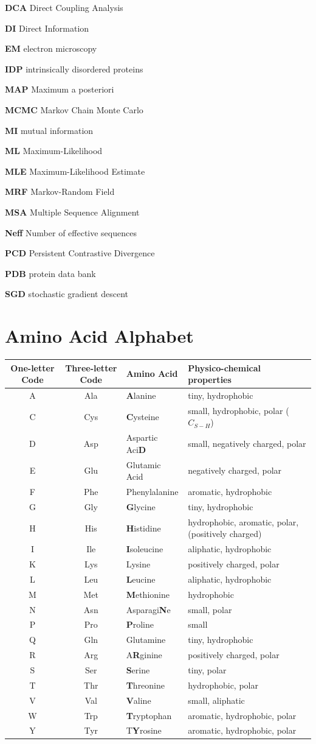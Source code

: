 \documentclass[12pt,a4paper,twoside]{book}
\theoremstyle{definition}
\theoremstyle{definition}
\theoremstyle{remark}
\begin{document}
\textbf{DCA} Direct Coupling Analysis

\textbf{DI} Direct Information

\textbf{EM} electron microscopy

\textbf{IDP} intrinsically disordered proteins

\textbf{MAP} Maximum a posteriori

\textbf{MCMC} Markov Chain Monte Carlo

\textbf{MI} mutual information

\textbf{ML} Maximum-Likelihood

\textbf{MLE} Maximum-Likelihood Estimate

\textbf{MRF} Markov-Random Field

\textbf{MSA} Multiple Sequence Alignment

\textbf{Neff} Number of effective sequences

\textbf{PCD} Persistent Contrastive Divergence

\textbf{PDB} protein data bank

\textbf{SGD} stochastic gradient descent

\pagebreak

\section{Amino Acid Alphabet}\label{amino-acids}

\begin{longtable}[]{@{}ccll@{}}
\toprule
One-letter Code & Three-letter Code & Amino Acid & Physico-chemical
properties\tabularnewline
\midrule
\endhead
A & Ala & \textbf{A}lanine & tiny, hydrophobic\tabularnewline
C & Cys & \textbf{C}ysteine & small, hydrophobic, polar
(\(C_{S-H}\))\tabularnewline
D & Asp & Aspartic Aci\textbf{D} & small, negatively charged,
polar\tabularnewline
E & Glu & Glutamic Acid & negatively charged, polar\tabularnewline
F & Phe & Phenylalanine & aromatic, hydrophobic\tabularnewline
G & Gly & \textbf{G}lycine & tiny, hydrophobic\tabularnewline
H & His & \textbf{H}istidine & hydrophobic, aromatic, polar, (positively
charged)\tabularnewline
I & Ile & \textbf{I}soleucine & aliphatic, hydrophobic\tabularnewline
K & Lys & Lysine & positively charged, polar\tabularnewline
L & Leu & \textbf{L}eucine & aliphatic, hydrophobic\tabularnewline
M & Met & \textbf{M}ethionine & hydrophobic\tabularnewline
N & Asn & Asparagi\textbf{N}e & small, polar\tabularnewline
P & Pro & \textbf{P}roline & small\tabularnewline
Q & Gln & Glutamine & tiny, hydrophobic\tabularnewline
R & Arg & A\textbf{R}ginine & positively charged, polar\tabularnewline
S & Ser & \textbf{S}erine & tiny, polar\tabularnewline
T & Thr & \textbf{T}hreonine & hydrophobic, polar\tabularnewline
V & Val & \textbf{V}aline & small, aliphatic\tabularnewline
W & Trp & \textbf{T}ryptophan & aromatic, hydrophobic,
polar\tabularnewline
Y & Tyr & T\textbf{Y}rosine & aromatic, hydrophobic,
polar\tabularnewline
\bottomrule
\end{longtable}
\end{document}
